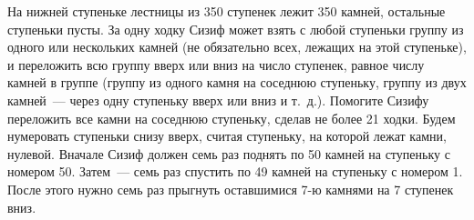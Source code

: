 \problem
На нижней ступеньке лестницы из 350 ступенек лежит 350 камней, остальные
ступеньки пусты.
За одну ходку Сизиф может взять с любой ступеньки группу из одного или
нескольких камней (не обязательно всех, лежащих на этой ступеньке), и
переложить всю группу вверх или вниз на число ступенек, равное числу камней в
группе (группу из одного камня на соседнюю ступеньку, группу из двух камней~---
через одну ступеньку вверх или вниз и т.~д.).
Помогите Сизифу переложить все камни на соседнюю ступеньку, сделав не более
21 ходки.
\solution
Будем нумеровать ступеньки снизу вверх, считая ступеньку, на которой лежат
камни, нулевой.
Вначале Сизиф должен семь раз поднять по 50 камней на ступеньку с номером 50.
Затем~--- семь раз спустить по 49 камней на ступеньку с номером 1.
После этого нужно семь раз прыгнуть оставшимися 7-ю камнями на 7 ступенек вниз.
\endproblem
